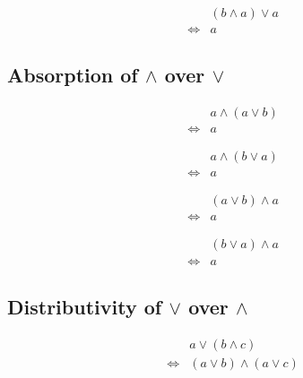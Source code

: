 \begin{prop}
\label{Proposition:lor_land_absorption_4}
\begin{align*}
& (b \land a) \lor a \\
\iff & a
\end{align*}
\end{prop}

\subsection{Absorption of $\land$ over $\lor$}
\begin{prop}
\label{Proposition:land_lor_absorption_1}
\begin{align*}
& a \land (a \lor b) \\
\iff & a
\end{align*}
\end{prop}

\begin{prop}
\label{Proposition:land_lor_absorption_2}
\begin{align*}
& a \land (b \lor a) \\
\iff & a
\end{align*}
\end{prop}

\begin{prop}
\label{Proposition:land_lor_absorption_3}
\begin{align*}
& (a \lor b) \land a \\
\iff & a
\end{align*}
\end{prop}

\begin{prop}
\label{Proposition:land_lor_absorption_4}
\begin{align*}
& (b \lor a) \land a \\
\iff & a
\end{align*}
\end{prop}

\subsection{Distributivity of $\lor$ over $\land$}
\begin{prop}
\label{Proposition:lor_land_distributivity_1}
\begin{align*}
& a \lor (b \land c) \\
\iff & (a \lor b) \land (a \lor c)
\end{align*}
\end{prop}

